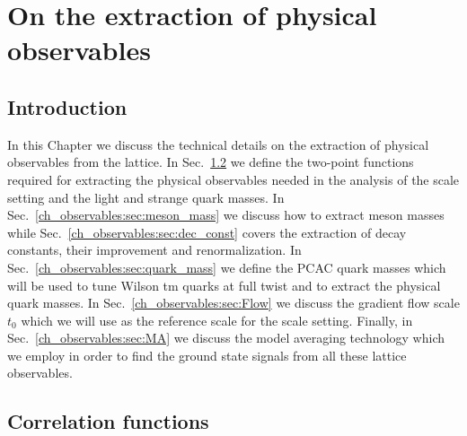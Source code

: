 \chapter{On the extraction of physical observables}


\label{ch_observables}


\section{Introduction}
\label{ch_observables:sec:general}

In this Chapter we discuss the technical details on the extraction of physical observables from the lattice. In Sec.~\ref{ch_observables:sec:correlators} we define the two-point functions required for extracting the physical observables needed in the analysis of the scale setting and the light and strange quark masses. In Sec.~\ref{ch_observables:sec:meson_mass} we discuss how to extract meson masses while Sec.~\ref{ch_observables:sec:dec_const} covers the extraction of decay constants, their improvement and renormalization. In  Sec.~\ref{ch_observables:sec:quark_mass} we define the PCAC quark masses which will be used to tune Wilson tm quarks at full twist and to extract the physical quark masses. In Sec.~\ref{ch_observables:sec:Flow} we discuss the gradient flow scale $t_0$ which we will use as the reference scale for the scale setting. Finally, in Sec.~\ref{ch_observables:sec:MA} we discuss the model averaging technology which we employ in order to find the ground state signals from all these lattice observables.


\section{Correlation functions}
\label{ch_observables:sec:correlators}


